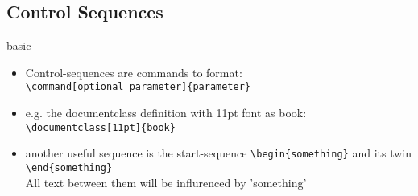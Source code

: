 \documentclass[hyperref={pdfpagelabels=false}]{beamer}
\begin{document}
    \subsection{Control Sequences}
        \begin{frame}[fragile]{basic}
			\begin{itemize}
				\item<1-> Control-sequences are commands to format: \\
                    \verb!\command[optional parameter]{parameter}!
                \item<2-> e.g. the documentclass definition with 11pt font as book: \\
                    \verb!\documentclass[11pt]{book}!
                \item<3-> another useful sequence is the start-sequence \verb!\begin{something}!
                          and its twin \verb!\end{something}! \\
                          All text between them will be influrenced by 'something'
            \end{itemize}
		\end{frame}
\end{document}
